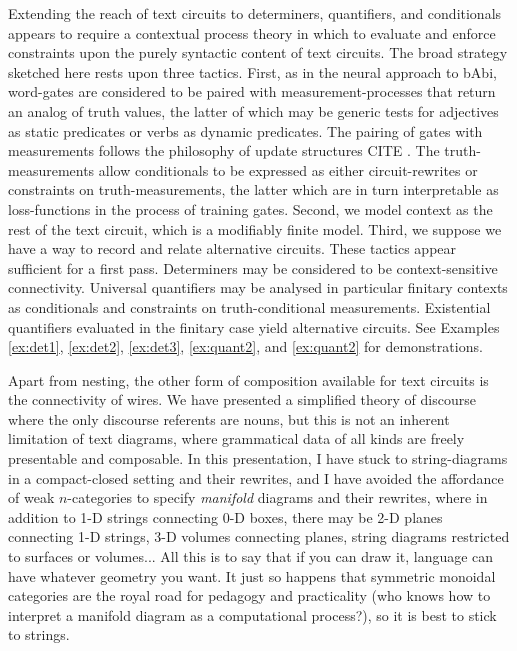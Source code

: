  Extending the reach of text circuits to determiners, quantifiers, and conditionals appears to require a contextual process theory in which to evaluate and enforce constraints upon the purely syntactic content of text circuits. The broad strategy sketched here rests upon three tactics. First, as in the neural approach to bAbi, word-gates are considered to be paired with measurement-processes that return an analog of truth values, the latter of which may be generic tests for adjectives as static predicates or verbs as dynamic predicates. The pairing of gates with measurements follows the philosophy of update structures \bR CITE \e. The truth-measurements allow conditionals to be expressed as either circuit-rewrites or constraints on truth-measurements, the latter which are in turn interpretable as loss-functions in the process of training gates. Second, we model context as the rest of the text circuit, which is a modifiably finite model. Third, we suppose we have a way to record and relate alternative circuits. These tactics appear sufficient for a first pass. Determiners may be considered to be context-sensitive connectivity. Universal quantifiers may be analysed in particular finitary contexts as conditionals and constraints on truth-conditional measurements. Existential quantifiers evaluated in the finitary case yield alternative circuits. See Examples \ref{ex:det1}, \ref{ex:det2}, \ref{ex:det3}, \ref{ex:quant2}, and \ref{ex:quant2} for demonstrations.

 Apart from nesting, the other form of composition available for text circuits is the connectivity of wires. We have presented a simplified theory of discourse where the only discourse referents are nouns, but this is not an inherent limitation of text diagrams, where grammatical data of all kinds are freely presentable and composable. In this presentation, I have stuck to string-diagrams in a compact-closed setting and their rewrites, and I have avoided the affordance of weak $n$-categories to specify \emph{manifold} diagrams and their rewrites, where in addition to 1-D strings connecting 0-D boxes, there may be 2-D planes connecting 1-D strings, 3-D volumes connecting planes, string diagrams restricted to surfaces or volumes... All this is to say that if you can draw it, language can have whatever geometry you want. It just so happens that symmetric monoidal categories are the royal road for pedagogy and practicality (who knows how to interpret a manifold diagram as a computational process?), so it is best to stick to strings.


